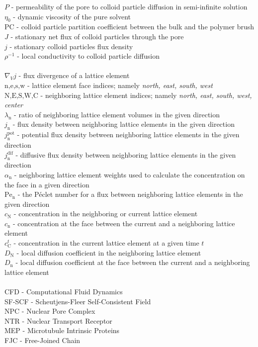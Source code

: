 \documentclass[12pt, a4paper]{article}
\begin{document}
$P$ - permeability of the pore to colloid particle diffusion in semi-infinite solution \\
$\eta_{0}$ - dynamic viscosity of the pure solvent \\
$\textrm{PC}$ - colloid particle partition coefficient between the bulk and the polymer brush \\
$J$ - stationary net flux of colloid particles through the pore \\
$j$ - stationary colloid particles flux density \\
$\rho^{-1}$ - local conductivity to colloid particle diffusion \\
\\
$\nabla_{V} j$ - flux divergence of a lattice element \\
$\textrm{n,e,s,w}$ - lattice element face indices; namely \textit{north, east, south, west} \\
$\textrm{N,E,S,W,C}$ - neighboring lattice element indices; namely \textit{north, east, south, west, center} \\
$\lambda_{\textrm{n}}$ - ratio of neighboring lattice element volumes in the given direction \\
$j_{\textrm{n}}$ - flux density between neighboring lattice elements in the given direction \\
$j^{\textrm{pot}}_{\textrm{n}}$ - potential flux density between neighboring lattice elements in the given direction \\
$j^{\textrm{dif}}_{\textrm{n}}$ - diffusive flux density between neighboring lattice elements in the given direction \\
$\alpha_{\textrm{n}}$ - neighboring lattice element weights used to calculate the concentration on the face in a given direction \\
$\textrm{Pe}_{\textrm{n}}$ - the Péclet number for a flux between neighboring lattice elements in the given direction \\
$c_{\textrm{N}}$ - concentration in the neighboring or current lattice element \\
$c_{\textrm{n}}$ - concentration at the face between the current and a neighboring lattice element \\ 
$c^{t}_{\textrm{C}}$ - concentration in the current lattice element at a given time $t$ \\ 
$D_{\textrm{N}}$ - local diffusion coefficient in the neighboring lattice element \\
$D_{\textrm{n}}$ - local diffusion coefficient at the face between the current and a neighboring lattice element \\
\\
CFD - Computational Fluid Dynamics \\
SF-SCF - Scheutjens-Fleer Self-Consistent Field \\
NPC - Nuclear Pore Complex \\
NTR - Nuclear Transport Receptor \\
MEP - Microtubule Intrinsic Proteins \\
FJC - Free-Joined Chain \\
\end{document}
